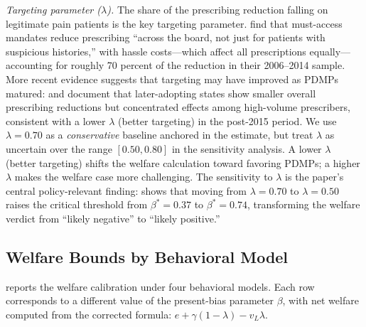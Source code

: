 \documentclass[12pt]{article}
\begin{document}
\textit{Targeting parameter ($\lambda$).} The share of the prescribing reduction falling on legitimate pain patients is the key targeting parameter. \citet{buchmueller2018effect} find that must-access mandates reduce prescribing ``across the board, not just for patients with suspicious histories,'' with hassle costs---which affect all prescriptions equally---accounting for roughly 70 percent of the reduction in their 2006--2014 sample. More recent evidence suggests that targeting may have improved as PDMPs matured: \citet{dave2021mandatory} and \citet{horwitz2021effect} document that later-adopting states show smaller overall prescribing reductions but concentrated effects among high-volume prescribers, consistent with a lower $\lambda$ (better targeting) in the post-2015 period. We use $\lambda = 0.70$ as a \textit{conservative} baseline anchored in the \citet{buchmueller2018effect} estimate, but treat $\lambda$ as uncertain over the range $[0.50, 0.80]$ in the sensitivity analysis. A lower $\lambda$ (better targeting) shifts the welfare calculation toward favoring PDMPs; a higher $\lambda$ makes the welfare case more challenging. The sensitivity to $\lambda$ is the paper's central policy-relevant finding:  shows that moving from $\lambda = 0.70$ to $\lambda = 0.50$ raises the critical threshold from $\beta^* = 0.37$ to $\beta^* = 0.74$, transforming the welfare verdict from ``likely negative'' to ``likely positive.''

\subsection{Welfare Bounds by Behavioral Model}\label{sec:welfare_bounds}

 reports the welfare calibration under four behavioral models. Each row corresponds to a different value of the present-bias parameter $\beta$, with net welfare computed from the corrected formula: $e + \gamma(1-\lambda) - v_L\lambda$.
\end{document}
